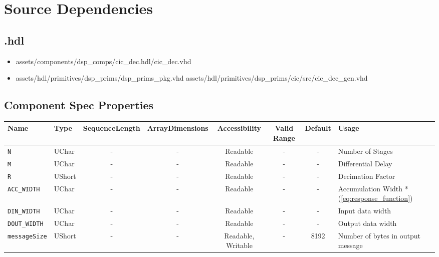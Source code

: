 \section*{Source Dependencies}
\subsection*{\comp.hdl}
\begin{itemize}
	\item assets/components/dsp\_comps/cic\_dec.hdl/cic\_dec.vhd
	\item assets/hdl/primitives/dsp\_prims/dsp\_prims\_pkg.vhd
	      \subitem assets/hdl/primitives/dsp\_prims/cic/src/cic\_dec\_gen.vhd
\end{itemize}

\begin{landscape}
	\section*{Component Spec Properties}
	\begin{scriptsize}
		\begin{tabular}{|p{3cm}|p{1.5cm}|c|c|c|c|c|p{7cm}|}
			\hline
			\rowcolor{blue}
			Name                      & Type   & SequenceLength & ArrayDimensions & Accessibility      & Valid Range & Default & Usage                                            \\
			\hline \verb+N+           & UChar  & -              & -               & Readable           & -           & -       & Number of Stages                                 \\
			\hline \verb+M+           & UChar  & -              & -               & Readable           & -           & -       & Differential Delay                               \\
			\hline \verb+R+           & UShort & -              & -               & Readable           & -           & -       & Decimation Factor                                \\
			\hline \verb+ACC_WIDTH+   & UChar  & -              & -               & Readable           & -           & -       & Accumulation Width *(\ref{eq:response_function}) \\
			\hline \verb+DIN_WIDTH+   & UChar  & -              & -               & Readable           & -           & -       & Input data width                                 \\
			\hline \verb+DOUT_WIDTH+  & UChar  & -              & -               & Readable           & -           & -       & Output data width                                \\
			\hline \verb+messageSize+ & UShort & -              & -               & Readable, Writable & -           & 8192    & Number of bytes in output message                \\
			\hline
		\end{tabular}
	\end{scriptsize}

\end{landscape}
